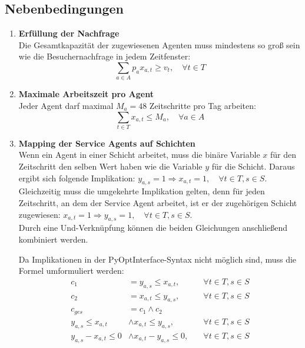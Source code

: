 \subsection*{Nebenbedingungen}
\begin{enumerate}
    \item \textbf{Erfüllung der Nachfrage}\\
          Die Gesamtkapazität der zugewiesenen Agenten muss mindestens so groß sein wie die Besuchernachfrage in jedem Zeitfenster:
          $$\sum_{a \in A} p_a x_{a,t} \geq v_t, \quad \forall t \in T$$
    \item \textbf{Maximale Arbeitszeit pro Agent}\\
          Jeder Agent darf maximal $M_a = 48$ Zeitschritte pro Tag arbeiten:
          $$\sum_{t \in T} x_{a,t} \leq M_a, \quad \forall a \in A$$
    \item \textbf{Mapping der Service Agents auf Schichten}\\
        Wenn ein Agent in einer Schicht arbeitet, muss die binäre Variable $x$ für den Zeitschritt den selben Wert haben wie die Variable $y$ für die Schicht.
        Daraus ergibt sich folgende Implikation: $ y_{a,s} = 1 \Rightarrow x_{a,t} = 1, \quad \forall t \in T , s \in S $.\\
        Gleichzeitig muss die umgekehrte Implikation gelten, denn für jeden Zeitschritt, an dem der Service Agent arbeitet, ist er der zugehörigen Schicht zugewiesen: $ x_{a,t}  = 1 \Rightarrow y_{a,s} = 1, \quad \forall t \in T , s \in S$.\\
        Durch eine Und-Verknüpfung können die beiden Gleichungen anschließend kombiniert werden.

        Da Implikationen in der PyOptInterface-Syntax nicht möglich sind, muss die Formel umformuliert werden:
        \begin{align*}
            c_1 & = y_{a,s} \leq x_{a,t}, & \quad \forall t \in T , s \in S\\
            c_2 & = x_{a,t} \leq y_{a,s}, & \quad \forall t \in T , s \in S\\
            c_{ges} & = c_1 \land c_2\\
            y_{a,s} \leq x_{a,t} & \land x_{a,t} \leq y_{a,s}, & \quad \forall t \in T , s \in S\\
            y_{a,s} - x_{a,t} \leq 0 & \land x_{a,t} - y_{a,s} \leq 0, & \quad \forall t \in T , s \in S
        \end{align*}


\end{enumerate}
